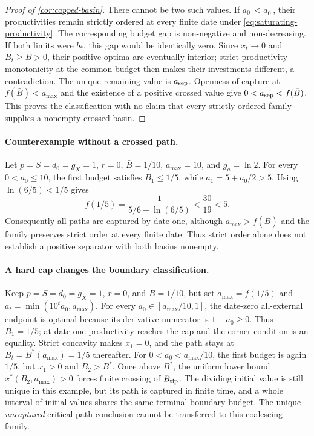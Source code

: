 \documentclass[11pt,a4paper]{article}
\theoremstyle{definition}\newtheorem{definition}{Definition}
\begin{document}
\begin{proof}[Proof of \cref{cor:capped-basin}]
There cannot be two such values. If $a_0^-<a_0^+$, their productivities
remain strictly ordered at every finite date under
\cref{eq:saturating-productivity}. The corresponding budget gap is
non-negative and non-decreasing. If both limits were $b_*$, this gap
would be identically zero. Since $x_t\to0$ and $B_t\geq\bar B>0$,
their positive optima are eventually interior; strict productivity
monotonicity at the common budget then makes their investments different,
a contradiction. The unique remaining value is $a_{\rm sep}$.
Openness of capture at $f(\bar B)<a_{\max}$ and the existence of a
positive crossed value give $0<a_{\rm sep}<f(\bar B)$.
This proves the classification with no claim that every strictly ordered
family supplies a nonempty crossed basin.
\end{proof}

\paragraph{Counterexample without a crossed path.}
Let $p=S=d_0=g_X=1$, $r=0$, $\bar B=1/10$, $a_{\max}=10$,
and $g_a=\ln2$. For every $0<a_0\leq10$, the first budget satisfies
$B_1\leq1/5$, while $a_1=5+a_0/2>5$.
Using $\ln(6/5)<1/5$ gives
\[
 f(1/5)=\frac1{5/6-\ln(6/5)}<\frac{30}{19}<5.
\]
Consequently all paths are captured by date one, although
$a_{\max}>f(\bar B)$ and the family preserves strict order at every
finite date. Thus strict order alone does not establish a positive
separator with both basins nonempty.

\paragraph{A hard cap changes the boundary classification.}
Keep $p=S=d_0=g_X=1$, $r=0$, and $\bar B=1/10$, but set
$a_{\max}=f(1/5)$ and $a_t=\min(10^ta_0,a_{\max})$.
For every $a_0\in[a_{\max}/10,1]$, the date-zero all-external endpoint
is optimal because its derivative numerator is $1-a_0\geq0$.
Thus $B_1=1/5$; at date one productivity reaches the cap and the corner
condition is an equality. Strict concavity makes $x_1=0$, and the path
stays at $B_t=B^*(a_{\max})=1/5$ thereafter.
For $0<a_0<a_{\max}/10$, the first budget is again $1/5$, but
$x_1>0$ and $B_2>B^*$. Once above $B^*$, the uniform lower bound
$x^*(B_2,a_{\max})>0$ forces finite crossing of $B_{\rm tip}$.
The dividing initial value is still unique in this example, but its
path is captured in finite time, and a whole interval of initial values
shares the same terminal boundary budget. The unique \emph{uncaptured}
critical-path conclusion cannot be transferred to this coalescing family.
\end{document}

